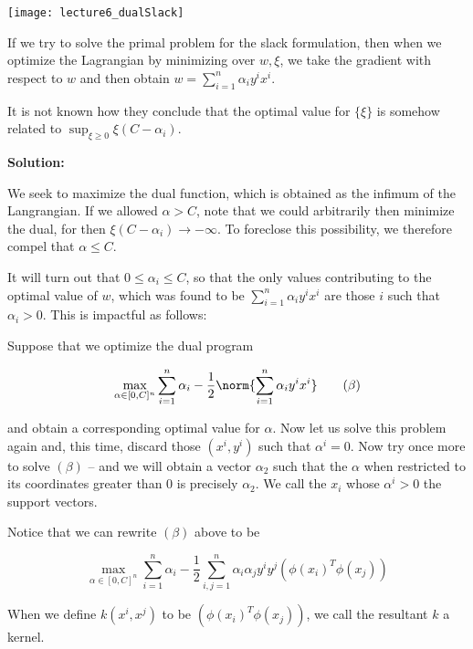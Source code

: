 \documentclass[../main.tex]{subfiles}
\begin{document}
\begin{remark}
    \begin{center}
        \texttt{[image: lecture6\_dualSlack]}
    \end{center}

    If we try to solve the primal problem for the slack formulation, then when we optimize
    the Lagrangian by minimizing over $w, \xi$, we take the gradient with respect to $w$
    and then obtain $w = \sum_{i=1}^{n}\alpha_{i}y^{i}x^{i}$.

    \begin{unresolved}
        It is not known how they conclude that the optimal value for $\{\xi\}$ is somehow
        related to $\sup_{\xi \geq 0} \xi(C - \alpha_i)$.

        \textbf{Solution:}

        We seek to maximize the dual function, which is obtained as the infimum of the
        Langrangian. If we allowed $\alpha > C$, note that we could arbitrarily then
        minimize the dual, for then $\xi(C - \alpha_i) \to -\infty$. To foreclose this
        possibility, we therefore compel that $\alpha \leq C$.
    \end{unresolved}

    It will turn out that $0 \leq \alpha_{i} \leq C$, so that the only values contributing
    to the optimal value of $w$, which was found to be $\sum_{i=1}^{n}\alpha_i y^{i}x^{i}$
    are those $i$ such that $\alpha_i > 0$. This is impactful as follows:

    Suppose that we optimize the dual program 

    \[
        \max_{\alpha \in [0,C]^n} \sum_{i=1}^{n}\alpha_{i} - \frac{1}{2}\norm{\sum_{i=1}^{n}\alpha_{i}y^{i}x^{i}} \tag{$\beta$}
    \]

    and obtain a corresponding optimal value for $\alpha$. Now let us solve this problem again and, this time, discard those $(x^{i}, y^{i})$ such that $\alpha^{i} = 0$. Now try once more to solve $(\beta)$ -- and we will obtain a vector $\alpha_2$ such that the $\alpha$ when restricted to its coordinates greater than $0$ is precisely $\alpha_2$. We call the $x_i$ whose $\alpha^i > 0$ the support vectors.
\end{remark}

\begin{remark}
    Notice that we can rewrite $(\beta)$ above to be

    \[
        \max_{\alpha \in [0,C]^n} \sum_{i=1}^{n}\alpha_{i} - \frac{1}{2}\sum_{i,j=1}^{n}\alpha_{i}\alpha_{j}y^{i}y^{j} (\phi(x_{i})^T \phi(x_{j}))
    \]

    When we define $k(x^{i}, x^{j})$ to be $(\phi(x_{i})^T \phi(x_{j}))$, we call the resultant $k$ a kernel.
\end{remark}
\end{document}
